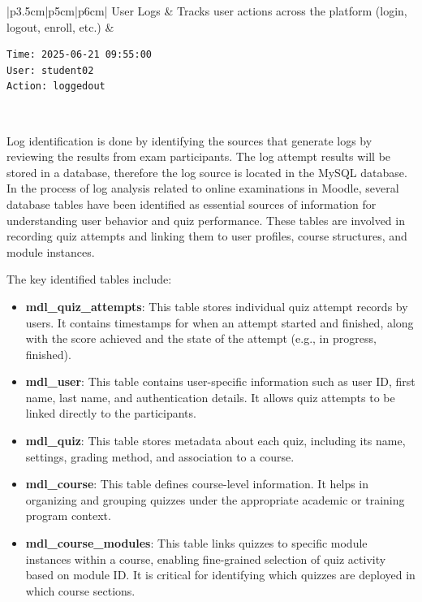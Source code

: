 \begin{longtable}{|p{3.5cm}|p{5cm}|p{6cm}|}
User Logs & Tracks user actions across the platform (login, logout, enroll, etc.) & 
\begin{minipage}[t]{\linewidth}
\begin{lstlisting}
Time: 2025-06-21 09:55:00 
User: student02 
Action: loggedout
\end{lstlisting}
\end{minipage} \\
\hline

\end{longtable}

Log identification is done by identifying the sources that generate logs by reviewing the results from exam participants. The log attempt results will be stored in a database, therefore the log source is located in the MySQL database.
In the process of log analysis related to online examinations in Moodle, several database tables have been identified as essential sources of information for understanding user behavior and quiz performance. These tables are involved in recording quiz attempts and linking them to user profiles, course structures, and module instances.

The key identified tables include:

\begin{itemize}
    \item \textbf{mdl\_quiz\_attempts}: This table stores individual quiz attempt records by users. It contains timestamps for when an attempt started and finished, along with the score achieved and the state of the attempt (e.g., in progress, finished).
    
    \item \textbf{mdl\_user}: This table contains user-specific information such as user ID, first name, last name, and authentication details. It allows quiz attempts to be linked directly to the participants.

    \item \textbf{mdl\_quiz}: This table stores metadata about each quiz, including its name, settings, grading method, and association to a course.

    \item \textbf{mdl\_course}: This table defines course-level information. It helps in organizing and grouping quizzes under the appropriate academic or training program context.

    \item \textbf{mdl\_course\_modules}: This table links quizzes to specific module instances within a course, enabling fine-grained selection of quiz activity based on module ID. It is critical for identifying which quizzes are deployed in which course sections.
\end{itemize}

